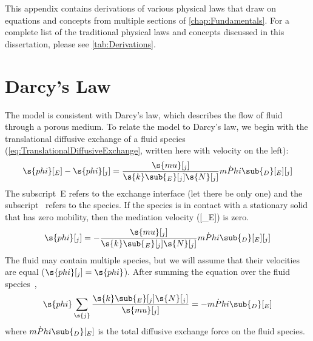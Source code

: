 This appendix contains derivations of various physical laws that draw on equations and concepts from multiple sections of \autoref{chap:Fundamentals}.  For a complete list of the traditional physical laws and concepts discussed in this dissertation, please see \autoref{tab:Derivations}.


\section{Darcy's Law}
\label{sec:Darcy}

The model is consistent with Darcy's law, which describes the flow of fluid through a porous medium.  To relate the model to Darcy's law, we begin with the translational diffusive exchange of a fluid species (\autoref{eq:TranslationalDiffusiveExchange}, written here with velocity on the left):
\begin{equation}
  \label{eq:Darcy1}
  \s{phi}[_E] - \s{phi}[_j] = \frac{\s{mu}[_j]}{\s{k}\sub{_E}[_j]\s{N}[_j]}\dot{mPhi}\sub{_D}[_E][_j]
\end{equation}
The subscript~E refers to the exchange interface (let there be only one) and the subscript~ refers to the species. If the species is in contact with a stationary solid that has zero mobility, then the mediation velocity ([_E]) is zero.
\begin{equation}
  \label{eq:Darcy2}
  \s{phi}[_j] = -\frac{\s{mu}[_j]}{\s{k}\sub{_E}[_j]\s{N}[_j]}\dot{mPhi}\sub{_D}[_E][_j]
\end{equation}
The fluid may contain multiple species, but we will assume that their velocities are equal ($\s{phi}[_j] = \s{phi}$).  After summing the equation over the fluid species~,
\begin{equation}
  \label{eq:Darcy3}
  \s{phi}\sum_{\s{j}}\frac{\s{k}\sub{_E}[_j]\s{N}[_j]}{\s{mu}[_j]} = -\dot{mPhi}\sub{_D}[_E]
\end{equation}
where $\dot{mPhi}\sub{_D}[_E]$ is the total diffusive exchange force on the fluid species.

